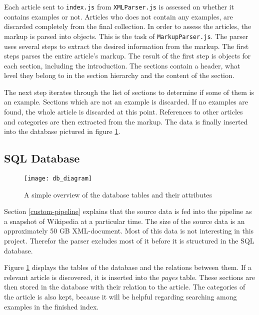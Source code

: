 Each article sent to \texttt{index.js} from \texttt{XMLParser.js} is assessed on whether it contains examples or not. Articles who does not contain any examples, are discarded completely from the final collection. In order to assess the articles, the markup is parsed into objects. This is the task of \texttt{MarkupParser.js}. The parser uses several steps to extract the desired information from the markup. The first steps parses the entire article's markup. The result of the first step is objects for each section, including the introduction. The sections contain a header, what level they belong to in the section hierarchy and the content of the section. 

The next step iterates through the list of sections to determine if some of them is an example. Sections which are not an example is discarded. If no examples are found, the whole article is discarded at this point. References to other articles and categories are then extracted from the markup. The data is finally inserted into the database pictured in figure \ref{fig:db_diagram}.



\subsection{SQL Database}

\begin{figure}[h] 
\caption{A simple overview of the database tables and their attributes}
\texttt{[image: db\_diagram]}
\label{fig:db_diagram}
\end{figure}


Section \ref{custom-pipeline} explains that the source data is fed into the pipeline as a snapshot of Wikipedia at a particular time. The size of the source data is an approximately 50 GB XML-document. Most of this data is not interesting in this project. Therefor the parser excludes most of it before it is structured in the SQL database. 

Figure \ref{fig:db_diagram} displays the tables of the database and the relations between them. If a relevant article is discovered, it is inserted into the \textit{pages} table. These sections are then stored in the database with their relation to the article. The categories of the article is also kept, because it will be helpful regarding searching among examples in the finished index.  

